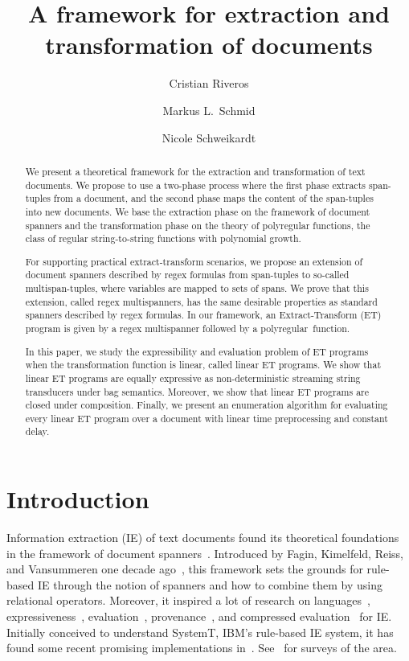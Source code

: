 \documentclass[
a4paper
]{article}
\title{A framework for extraction and transformation of documents}
\author[1]{Cristian Riveros}
\author[2]{Markus L.\ Schmid}
\author[2]{Nicole Schweikardt}
\affil[1]{Pontificia Universidad Católica de Chile, \texttt{cristian.riveros@uc.cl}}
\affil[2]{Humboldt-Universität zu Berlin, Germany, \texttt{MLSchmid@MLSchmid.de}, \texttt{schweikn@informatik.hu-berlin.de}}
\date{}
\theoremstyle{plain}
\theoremstyle{definition}
\theoremstyle{remark}
\begin{document}
\maketitle

\begin{abstract}
We present a theoretical framework for the extraction and transformation of text documents. We propose to use a two-phase process where the first phase extracts span-tuples from a document, and the second phase maps the content of the span-tuples into new documents. We base the extraction phase on the framework of document spanners and the transformation phase on the theory of polyregular functions, the class of regular string-to-string functions with polynomial growth.

For supporting practical extract-transform scenarios, we propose an extension of document spanners described by regex formulas from span-tuples to so-called multispan-tuples, where variables are mapped to sets of spans. We prove that this extension, called regex multispanners, has the same desirable properties as standard spanners described by regex formulas. 
In our framework, an Extract-Transform (ET) program is given by a regex multispanner followed by a polyregular~function. 

In this paper, we study the expressibility and evaluation problem of ET programs when the transformation function is linear, called linear ET programs. We show that linear ET programs are equally expressive as non-deterministic streaming string transducers under bag semantics.
Moreover, we show that linear ET programs are closed under composition.
Finally, we present an enumeration algorithm for evaluating every linear ET program over a document with linear time preprocessing and constant delay.  
\end{abstract}

 
\section{Introduction}\label{sec:introduction}
	
Information extraction (IE) of text documents found its theoretical foundations in the framework of document spanners~\cite{fagin2015document}. Introduced by Fagin, Kimelfeld, Reiss, and Vansummeren one decade ago~\cite{FaginKRV13}, this framework sets the grounds for rule-based IE through the notion of spanners and how to combine them by using relational operators. Moreover, it inspired a lot of research on languages~\cite{Freydenberger2019,Peterfreund21}, expressiveness~\cite{freydenberger2018document,maturana2018document,PeterfreundCFK19,DoleschalEtAl2019,SchmidSchweikardt_ICDT21},
evaluation~\cite{florenzano2020efficient,amarilli2021constant,doleschal2019split,BourhisEtAl2021,FreydenbergerEtAl2018,PeterfreundEtAl2019,FreydenbergerThompson2022}, provenance~\cite{doleschal2022weight,DoleschalKM23}, and compressed evaluation~\cite{schmid2021spanner,SchmidSchweikardtPODS2022,MunozR23} for IE. Initially conceived to understand SystemT, IBM's rule-based IE system, it has found some recent promising implementations in~\cite{RiverosJV23}. See~\cite{SchmidSchweikardt_Gems,DBLP:journals/sigmod/AmarilliBMN20} for surveys of the area.
\end{document}
